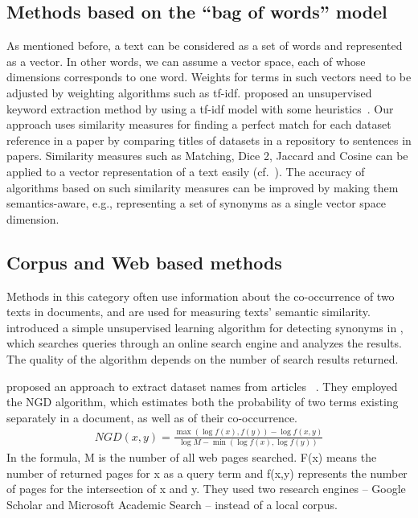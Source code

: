 \documentclass{IOS-Book-Article}
\begin{document}
\subsection{Methods based on the “bag of words” model}
As mentioned before, a text can be considered as a set of words and represented as a vector.
In other words, we can assume a vector space, each of whose dimensions corresponds to one word.
Weights for terms in such vectors need to be adjusted by weighting algorithms such as tf-idf.
\citeauthor{Lee2008} proposed an unsupervised keyword extraction method by using a tf-idf model with some heuristics~\citeyearpar{Lee2008}.
Our approach uses similarity measures for finding a perfect match for each dataset reference in a paper by comparing titles of datasets in a repository to sentences in papers.
Similarity measures such as Matching, Dice 2, Jaccard and Cosine can be applied to a vector representation of a text easily (cf.~\citet{ChristopherD1999}).
The accuracy of algorithms based on such similarity measures can be improved by making them semantics-aware, e.g., representing a set of synonyms as a single vector space dimension.

\subsection{Corpus and Web based methods}
Methods in this category often use information about the co-occurrence of two texts in documents, and are used for measuring texts' semantic similarity.
\citeauthor{Turney2001} introduced a simple unsupervised learning algorithm for detecting synonyms in \citeyear{Turney2001}, which searches queries through an online search engine and analyzes the results. The quality of the algorithm depends on the number of search results returned.  

\citeauthor{sighal2013} proposed an approach to extract dataset names from articles ~\citeyearpar{sighal2013}. They employed the NGD algorithm, which estimates both the probability of two terms existing separately in a document, as well as of their co-occurrence. 
\begin{align*}
	NGD(x,y)=\frac{\max(\log f(x),f(y))-\log f(x,y)}{\log M -\min(\log f(x),\log f(y))}
\end{align*}
In the formula, M is the number of all web pages searched. F(x) means the number of returned pages for x as a query term and f(x,y) represents the number of pages for the intersection of x and y. 
They used two research engines -- Google Scholar and Microsoft Academic Search -- instead of a local corpus.
\end{document}
